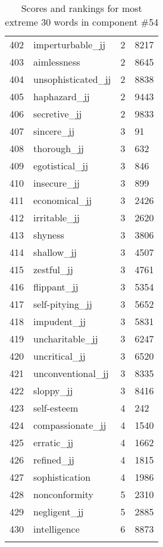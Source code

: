 \begin{longtable}[!htbp]{| rlr@{.}l |}
    402 & imperturbable\_jj & 2 & 8217 \\
    403 & aimlessness & 2 & 8645 \\
    404 & unsophisticated\_jj & 2 & 8838 \\
    405 & haphazard\_jj & 2 & 9443 \\
    406 & secretive\_jj & 2 & 9833 \\
    407 & sincere\_jj & 3 & 91 \\
    408 & thorough\_jj & 3 & 632 \\
    409 & egotistical\_jj & 3 & 846 \\
    410 & insecure\_jj & 3 & 899 \\
    411 & economical\_jj & 3 & 2426 \\
    412 & irritable\_jj & 3 & 2620 \\
    413 & shyness & 3 & 3806 \\
    414 & shallow\_jj & 3 & 4507 \\
    415 & zestful\_jj & 3 & 4761 \\
    416 & flippant\_jj & 3 & 5354 \\
    417 & self-pitying\_jj & 3 & 5652 \\
    418 & impudent\_jj & 3 & 5831 \\
    419 & uncharitable\_jj & 3 & 6247 \\
    420 & uncritical\_jj & 3 & 6520 \\
    421 & unconventional\_jj & 3 & 8335 \\
    422 & sloppy\_jj & 3 & 8416 \\
    423 & self-esteem & 4 & 242 \\
    424 & compassionate\_jj & 4 & 1540 \\
    425 & erratic\_jj & 4 & 1662 \\
    426 & refined\_jj & 4 & 1815 \\
    427 & sophistication & 4 & 1986 \\
    428 & nonconformity & 5 & 2310 \\
    429 & negligent\_jj & 5 & 2885 \\
    430 & intelligence & 6 & 8873 \\
    \hline
    \caption{Scores and rankings for most extreme 30 words in component \#54} \\
\end{longtable}
